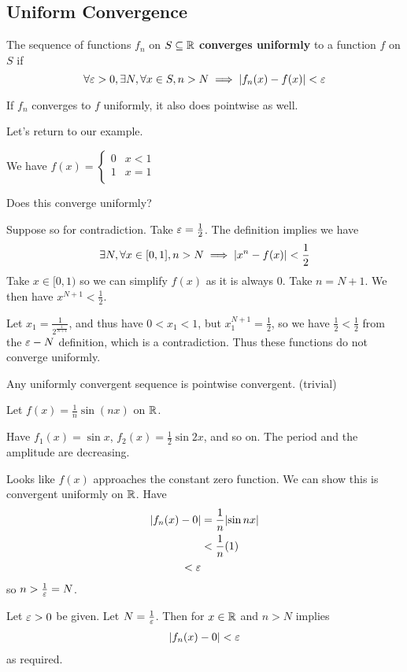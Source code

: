 \documentclass{article}
\begin{document}
\subsection{Uniform Convergence}
\begin{definition}
  The sequence of functions $f_n$ on $S \subseteq \mathbb{R}$ \textbf{converges uniformly} to a function $f$ on $S$ if \[
    \forall \varepsilon > 0, \exists N, \forall x \in S, n > N \implies \abs{f_n(x) - f(x)} < \varepsilon
  \]
\end{definition}
\begin{remark}
  If $f_n$ converges to $f$ uniformly, it also does pointwise as well.
\end{remark}
\begin{example}
  Let's return to our example.

  We have $f(x) =
  \begin{cases}
    0 & x < 1\\
    1 & x = 1\\
  \end{cases}$

  Does this converge uniformly?

  Suppose so for contradiction. Take $\varepsilon = \frac{1}{2}$. The definition implies we have \[
    \exists N, \forall x \in [0, 1], n > N \implies \abs{x^n - f(x)} < \frac{1}{2}
  \]
  Take $x \in [0, 1)$ so we can simplify $f(x)$ as it is always $0$. Take $n = N+1$.
  We then have $x^{N+1} < \frac{1}{2}$.

  Let $x_1 = \frac{1}{2^{\frac{1}{N+1}}}$, and thus have $0 < x_1 < 1$, but $x_1^{N+1} = \frac{1}{2}$, so we have $\frac{1}{2} < \frac{1}{2}$ from the $\varepsilon-N$ definition, which is a contradiction. Thus these functions do not converge uniformly.
\end{example}
\begin{corollary}
  Any uniformly convergent sequence is pointwise convergent. (trivial)
\end{corollary}
\begin{example}
  Let $f(x) = \frac{1}{n} \sin(nx)$ on $\mathbb{R}$.

  Have $f_1(x) = \sin x$, $f_2(x) = \frac{1}{2}\sin 2x$, and so on. The period and the amplitude are decreasing.

  Looks like $f(x)$ approaches the constant zero function. We can show this is convergent uniformly on $\mathbb{R}$. Have
  \begin{align*}
    \abs{f_n(x) - 0} &= \frac{1}{n}\abs{\sin nx}\\
    &< \frac{1}{n} (1)\\
    < \varepsilon
  \end{align*} so $n > \frac{1}{\varepsilon} = N$.

  Let $\varepsilon > 0$ be given. Let $N = \frac{1}{\varepsilon}$. Then for $x \in \mathbb{R}$ and $n > N$ implies
  \begin{align*}
    \abs{f_n(x) - 0} < \varepsilon
  \end{align*} as required.
\end{example}
\end{document}
